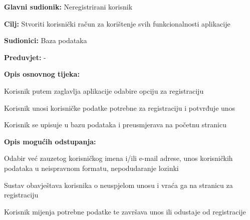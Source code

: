 					\noindent {}
					\begin{packed_item}
						
						\item \textbf{Glavni sudionik: } Neregistrirani korisnik 
						\item  \textbf{Cilj:} Stvoriti korisnički račun za korištenje svih funkcionalnosti aplikacije
						\item  \textbf{Sudionici:} Baza podataka 
						\item  \textbf{Preduvjet:} -
						\item  \textbf{Opis osnovnog tijeka:}
						
						\item[] \begin{packed_enum}
							
							\item Korisnik putem zaglavlja aplikacije odabire opciju za registraciju 
							\item Korisnik unosi korisničke podatke potrebne za registraciju i potvrđuje unos
							\item Korisnik se upisuje u bazu podataka i preusmjerava na početnu stranicu
							
						\end{packed_enum}
						
						\item  \textbf{Opis mogućih odstupanja:}
						
						\item[] \begin{packed_item}
	
							\item[2.a] Odabir već zauzetog korisničkog imena i/ili e-mail adrese, unos korisničkih podataka u neispravnom formatu, nepodudaranje lozinki 
							\item[] \begin{packed_enum}
								
								\item Sustav obavještava korisnika o neuspjelom unosu i vraća ga na stranicu za registraciju 
								\item Korisnik mijenja potrebne podatke te završava unos ili odustaje od registracije
								
							\end{packed_enum}
							
							
						\end{packed_item}
					\end{packed_item}
				
